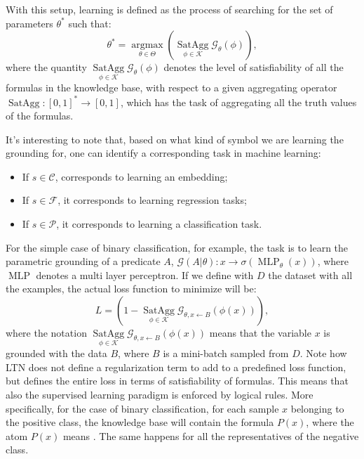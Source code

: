 With this setup, learning is defined as the process of searching for the set of parameters $\theta^*$ such that:
 	\begin{equation*}
 	\theta^{*}=\underset{\theta \in \Theta}{\operatorname{argmax}} \left(\underset{\phi \in \mathcal{K}} {\operatorname{SatAgg}} \mathcal{G}_{\theta}(\phi)\right),
 	\end{equation*} 
 where the quantity $\underset{\phi \in \mathcal{K}} {\operatorname{SatAgg}} \mathcal{G}_{\theta}(\phi)$ denotes the level of satisfiability of all the formulas in the knowledge base, with respect to a given aggregating operator $\operatorname{SatAgg}:\left[0,1\right]^* \rightarrow \left[0,1\right]$, which has the task of aggregating all the truth values of the formulas.

 
 It's interesting to note that, based on what kind of symbol we are learning the grounding for, one can identify a corresponding task in machine learning:
 \begin{itemize}
 	\item If $s \in \mathcal{C}$, corresponds to learning an embedding;
 	\item If $s \in \mathcal{F}$, it corresponds to learning regression tasks;
 	\item If $s \in \mathcal{P}$, it corresponds to learning a classification task.
 \end{itemize}
For the simple case of binary classification, for example, the task is to learn the parametric grounding of a predicate $A$, $\mathcal{G}(A|\theta):x \rightarrow \sigma(\operatorname{MLP}_{\theta}(x))$, where $\operatorname{MLP}$ denotes a multi layer perceptron. If we define with $D$ the dataset with all the examples, the actual loss function to minimize will be:
	\begin{equation*}
	L = \left(1 - \underset{\phi \in \mathcal{K}} {\operatorname{SatAgg}} \mathcal{G}_{\theta,x\leftarrow B}(\phi(x)) \right),
	\end{equation*}
	where the notation $\underset{\phi \in \mathcal{K}} {\operatorname{SatAgg}} \mathcal{G}_{\theta,x\leftarrow B}(\phi(x))$ means that the variable $x$ is grounded with the data $B$, where $B$ is a mini-batch sampled from $D$. 
	\textcolor{unipd}{Note how LTN does not define a regularization term to add to a predefined loss function, but defines the entire loss in terms of satisfiability of formulas. This means that also the supervised learning paradigm is enforced by logical rules. More specifically, for the case of binary classification, for each sample $x$ belonging to the positive class, the knowledge base will contain the formula $P(x)$, where the atom $P(x)$ means . The same happens for all the representatives of the negative class.}

